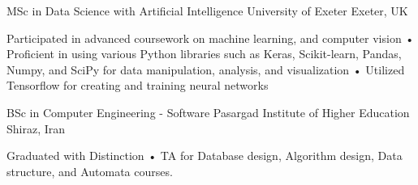 

\begin{cventries}

  \cventry
    {MSc in Data Science with Artificial Intelligence} %
    {University of Exeter} %
    {Exeter, UK} %
    {} %
    {
      \begin{cvitems} %
        \item {Participated in advanced coursework on machine learning, and computer vision • Proficient in using various Python libraries such as Keras, Scikit-learn, Pandas, Numpy, and SciPy for data manipulation, analysis, and visualization • Utilized Tensorflow for creating and training neural networks}
      \end{cvitems}
    }
    
  \cventry
    {BSc in Computer Engineering - Software} %
    {Pasargad Institute of Higher Education} %
    {Shiraz, Iran} %
    {} %
    {
      \begin{cvitems} %
        \item {Graduated with Distinction • TA for Database design, Algorithm design, Data structure, and Automata courses.}
      \end{cvitems}
    }
\end{cventries}
